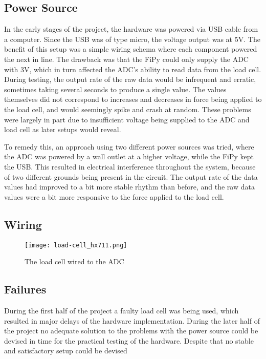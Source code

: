\subsection{Power Source}
In the early stages of the project, the hardware was powered via USB cable from a computer. Since the USB was of type micro, the voltage output was at 5V. The benefit of this setup was a simple wiring schema where each component powered the next in line. The drawback was that the FiPy could only supply the ADC with 3V, which in turn affected the ADC's ability to read data from the load cell. During testing, the output rate of the raw data would be infrequent and erratic, sometimes taking several seconds to produce a single value. The values themselves did not correspond to increases and decreases in force being applied to the load cell, and would seemingly spike and crash at random. These problems were largely in part due to insufficient voltage being supplied to the ADC and load cell as later setups would reveal.

To remedy this, an approach using two different power sources was tried, where the ADC was powered by a wall outlet at a higher voltage, while the FiPy kept the USB. This resulted in electrical interference throughout the system, because of two different grounds being present in the circuit. The output rate of the data values had improved to a bit more stable rhythm than before, and the raw data values were a bit more responsive to the force applied to the load cell. 

\subsection{Wiring}
\begin{figure}[h]
	\centering
	\texttt{[image: load-cell\_hx711.png]}
	\caption{The load cell wired to the ADC}
	\label{fig:load-cell_hx711}
\end{figure}

\subsection{Failures}
During the first half of the project a faulty load cell was being used, which resulted in major delays of the hardware implementation. During the later half of the project no adequate solution to the problems with the power source could be devised in time for the practical testing of the hardware. Despite that no stable and satisfactory setup could be devised




